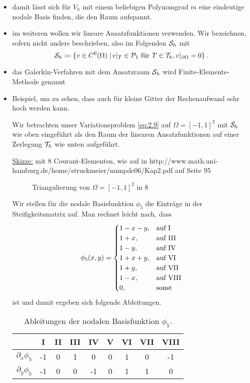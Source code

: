 \begin{itemize}
\item damit lässt sich für $V_h$ mit einem beliebigen Polynomgrad $m$ eine eindeutige nodale Basis finden, die den Raum aufspannt.

\item im weiteren wollen wir lineare Ansatzfunktionen verwenden. Wir bezeichnen, sofern nicht anders beschrieben, also im Folgenden $\mathcal S_h$ mit
\[
	\mathcal S_h \coloneqq \{v \in C^0(\Omega) \;\vert\, v|_T \in \mathcal P_1 \text{ für } T\in \mathcal T_h, v|_{\partial \Omega} = 0\} \, .
\]

\item das Galerkin-Verfahren mit dem Ansatzraum $\mathcal S_h$ wird Finite-Elemente-Methode genannt

\item Beispiel, um zu sehen, dass auch für kleine Gitter der Rechenaufwand sehr hoch werden kann.
\begin{bsp}
Wir betrachten unser Variationsproblem \eqref{eq:2.9} auf $\Omega = [-1,1]^2$ mit $\mathcal S_h$ wie oben eingeführt als den Raum der linearen Ansatzfunktionen auf einer Zerlegung $\mathcal T_h$ wie unten aufgeführt.

\underline{Skizze:} mit 8 Courant-Elementen, wie auf in http://www.math.uni-hamburg.de/home/struckmeier/numpde06/Kap2.pdf auf Seite 95

\begin{figure}[h]
\caption{Triangulierung von $\Omega = [-1,1]^2$ in 8 \textit{}}
\end{figure}

Wir stellen für die nodale Basisfunktion $\phi_5$ die Einträge in der Steifigkeitsmatrix auf. Man rechnet leicht nach, dass
\begin{align*}
	\phi_5(x,y) = \begin{cases}
					1-x-y , & \text{auf }  \mathord{ \mathrm{ I } }  \\
					1+x, & \text{auf }  \mathord{ \mathrm{ III } }  \\
					1-y, & \text{auf }  \mathord{ \mathrm{ IV } }  \\
					1+x+y, & \text{auf }  \mathord{ \mathrm{ VI } }  \\
					1+y, & \text{auf } \mathord{ \mathrm{ VII } } \\
					1-x, & \text{auf } \mathord{ \mathrm{ VIII } }  \\
					0, & \text{sonst}
				\end{cases}
\end{align*}
ist und damit ergeben sich folgende Ableitungen.

\begin{table}[htpb]
\centering
\begin{tabular}[c]{|c|c|c|c|c|c|c|c|c|}
	\hline
      & I & II & III & IV & V & VI & VII & VIII\\
	\hline
     $\partial_x \phi_5$ &-1 &0 &1& 0&0 &1 &0 &-1  \\
     $\partial_y \phi_5$ & -1&0 & 0& -1& 0& 1& 1& 0\\
	\hline
\end{tabular}
\caption{Ableitungen der nodalen Basisfunktion $\phi_5$.}
\end{table}


\end{bsp}
\end{itemize}
